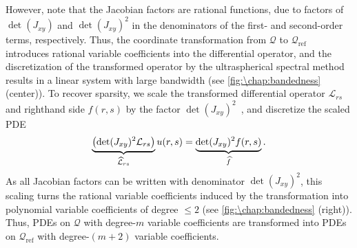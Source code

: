 However, note that the Jacobian factors are rational functions, due to factors of $\det(J_{xy})$ and $\det(J_{xy})^2$ in the denominators of the first- and second-order terms, respectively. Thus, the coordinate transformation from $\mathcal{Q}$ to $\mathcal{Q}_\text{ref}$ introduces rational variable coefficients into the differential operator, and the discretization of the transformed operator by the ultraspherical spectral method results in a linear system with large bandwidth (see \cref{fig:\chap:bandedness} (center)). To recover sparsity, we scale the transformed differential operator $\mathcal{L}_{rs}$ and righthand side $f(r,s)$ by the factor $\det(J_{xy})^2$~\cite{Yeiser_18_01}, and discretize the scaled PDE
\[
\underbrace{\left( \det(J_{xy})^2 \mathcal{L}_{rs} \right)}_{\widehat{\mathcal{L}}_{rs}} u(r,s) = \underbrace{\det(J_{xy})^2 f(r,s)}_{\widehat{f}}.
\vspace{-0.3em}
\]
As all Jacobian factors can be written with denominator $\det(J_{xy})^2$, this scaling turns the rational variable coefficients induced by the transformation into polynomial variable coefficients of degree $\leq 2$ (see \cref{fig:\chap:bandedness} (right)). Thus, PDEs on $\mathcal{Q}$ with degree-$m$ variable coefficients are transformed into PDEs on $\mathcal{Q}_\text{ref}$ with degree-$(m+2)$ variable coefficients.

